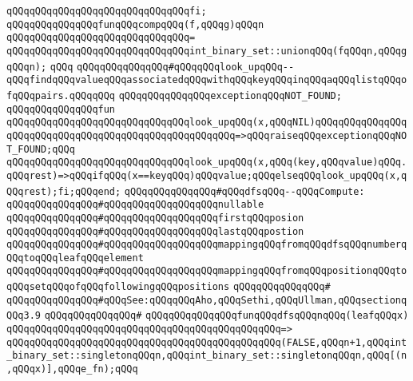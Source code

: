 \verb|qQQqqQQqqQQqqQQqqQQqqQQqqQQqqQQqfi;|\newline
\newline
\verb|qQQqqQQqqQQqqQQqfunqQQqcompqQQq(f,qQQqg)qQQqn|\newline
\verb|qQQqqQQqqQQqqQQqqQQqqQQqqQQqqQQq=|\newline
\verb|qQQqqQQqqQQqqQQqqQQqqQQqqQQqqQQqint_binary_set::unionqQQq(fqQQqn,qQQqgqQQqn);|\newline
\verb|qQQq|\newline
\verb|qQQqqQQqqQQqqQQq#qQQqqQQqlook_upqQQq--qQQqfindqQQqvalueqQQqassociatedqQQqwithqQQqkeyqQQqinqQQqaqQQqlistqQQqofqQQqpairs.qQQqqQQq|\newline
\verb|qQQqqQQqqQQqqQQqexceptionqQQqNOT_FOUND;|\newline
\verb|qQQqqQQqqQQqqQQqfun|\newline
\verb|qQQqqQQqqQQqqQQqqQQqqQQqqQQqqQQqlook_upqQQq(x,qQQqNIL)qQQqqQQqqQQqqQQqqQQqqQQqqQQqqQQqqQQqqQQqqQQqqQQqqQQqqQQq=>qQQqraiseqQQqexceptionqQQqNOT_FOUND;qQQq|\newline
\verb|qQQqqQQqqQQqqQQqqQQqqQQqqQQqqQQqlook_upqQQq(x,qQQq(key,qQQqvalue)qQQq.qQQqrest)=>qQQqifqQQq(x==keyqQQq)qQQqvalue;qQQqelseqQQqlook_upqQQq(x,qQQqrest);fi;qQQqend;|\newline
\newline
\verb|qQQqqQQqqQQqqQQq#qQQqdfsqQQq--qQQqCompute:|\newline
\verb|qQQqqQQqqQQqqQQq#qQQqqQQqqQQqqQQqqQQqnullable|\newline
\verb|qQQqqQQqqQQqqQQq#qQQqqQQqqQQqqQQqqQQqfirstqQQqposion|\newline
\verb|qQQqqQQqqQQqqQQq#qQQqqQQqqQQqqQQqqQQqlastqQQqpostion|\newline
\verb|qQQqqQQqqQQqqQQq#qQQqqQQqqQQqqQQqqQQqmappingqQQqfromqQQqdfsqQQqnumberqQQqtoqQQqleafqQQqelement|\newline
\verb|qQQqqQQqqQQqqQQq#qQQqqQQqqQQqqQQqqQQqmappingqQQqfromqQQqpositionqQQqtoqQQqsetqQQqofqQQqfollowingqQQqpositions|\newline
\verb|qQQqqQQqqQQqqQQq#|\newline
\verb|qQQqqQQqqQQqqQQq#qQQqSee:qQQqqQQqAho,qQQqSethi,qQQqUllman,qQQqsectionqQQq3.9|\newline
\verb|qQQqqQQqqQQqqQQq#|\newline
\verb|qQQqqQQqqQQqqQQqfunqQQqdfsqQQqnqQQq(leafqQQqx)|\newline
\verb|qQQqqQQqqQQqqQQqqQQqqQQqqQQqqQQqqQQqqQQqqQQqqQQq=>|\newline
\verb|qQQqqQQqqQQqqQQqqQQqqQQqqQQqqQQqqQQqqQQqqQQqqQQq(FALSE,qQQqn+1,qQQqint_binary_set::singletonqQQqn,qQQqint_binary_set::singletonqQQqn,qQQq[(n,qQQqx)],qQQqe_fn);qQQq|\newline
